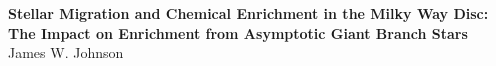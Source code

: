 \documentclass[12pt]{report}
\newcommand{\biblio}{
	
	
}
\begin{document}
 
\renewcommand{\biblio}{} 

\begin{center} 
\textbf{{\Large Stellar Migration and Chemical Enrichment in the Milky Way Disc: 
The Impact on Enrichment from Asymptotic Giant Branch Stars}} 
\\ 
James W. Johnson 
\end{center}

 
\newpage 
 
\newpage 
 

 
 
\end{document}
